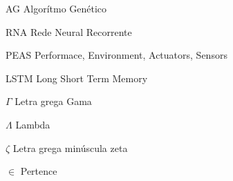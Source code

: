 \listoftables*
\cleardoublepage


\begin{siglas}
  \item[AG] Algorítmo Genético
  \item[RNA] Rede Neural Recorrente
  \item[PEAS] Performace, Environment,  Actuators, Sensors
  \item[LSTM] Long Short Term Memory
\end{siglas}

\begin{simbolos}
 \item[$ \Gamma $] Letra grega Gama
 \item[$ \Lambda $] Lambda
 \item[$ \zeta $] Letra grega minúscula zeta
 \item[$ \in $] Pertence
\end{simbolos}


\tableofcontents*
\cleardoublepage
